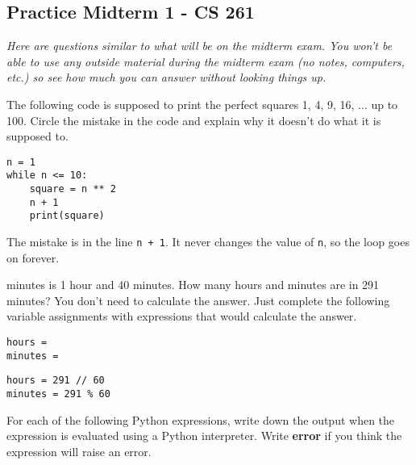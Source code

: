 \documentclass[12pt]{exam}
\begin{document}
\pagestyle{empty}
\graphicspath{{/home/brian/Dropbox/HSC/Spring16/Math111/}}

\subsection*{Practice Midterm 1 - CS 261}
\textit{Here are questions similar to what will be on the midterm exam.  You won't be able to use any outside material during the midterm exam (no notes, computers, etc.) so see how much you can answer without looking things up.}

\begin{questions}

\question The following code is supposed to print the perfect squares 1, 4, 9, 16, $\ldots$ up to 100.  Circle the mistake in the code and explain why it doesn't do what it is supposed to. 
\lstset{language=Python}
\lstset{columns=fixed}
\begin{lstlisting}
n = 1
while n <= 10:
    square = n ** 2
    n + 1
    print(square)
\end{lstlisting}
\begin{solution}
The mistake is in the line \lstinline{n + 1}.  It never changes the value of \lstinline{n}, so the loop goes on forever.
\end{solution}
 

 minutes is 1 hour and 40 minutes. How many hours and minutes are in 291 minutes?  You don't need to calculate the answer.  Just complete the following variable assignments with expressions that would calculate the answer.
\lstset{language=Python}
\begin{lstlisting}
hours = 
minutes = 
\end{lstlisting}
\begin{solution}
\begin{lstlisting}
hours = 291 // 60
minutes = 291 % 60
\end{lstlisting}

\end{solution}

\question For each of the following Python expressions, write down the output when the expression is evaluated using a Python interpreter. Write \textbf{error} if you think the expression will raise an error.

\end{questions}
\end{document}
